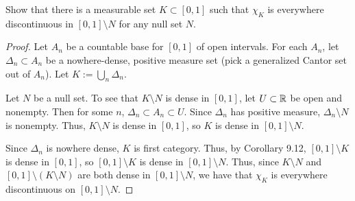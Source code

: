 \documentclass{article}
\begin{document}
 Show that there is a measurable set $K \subset [0,1]$ such that $\chi_K$ is everywhere discontinuous in $[0,1] \setminus N$ for any null set $N$.
\begin{proof}
Let $A_n$ be a countable base for $[0,1]$ of open intervals. For each $A_n$, let $\Delta_n \subset A_n$ be a nowhere-dense, positive measure set (pick a generalized Cantor set out of $A_n$).  Let $K := \bigcup_n \Delta_n$. 

Let $N$ be a null set. To see that $K \setminus N$ is dense in $[0,1]$, let $U \subset \mathbb{R}$ be open and nonempty. Then for some $n$, $\Delta_n \subset A_n \subset U$.  Since $\Delta_n$ has positive measure, $\Delta_n \setminus N$ is nonempty.  Thus, $K \setminus N$ is dense in $[0,1]$, so $K$ is dense in $[0,1] \setminus N$.

Since $\Delta_n$ is nowhere dense, $K$ is first category. Thus,  by Corollary 9.12, $[0,1] \setminus K$ is dense in $[0,1]$, so $[0,1]\setminus K$ is dense in $[0,1] \setminus N$.  Thus, since $K\setminus N$ and $[0,1] \setminus (K\setminus N)$ are both dense in $[0,1] \setminus N$, we have that $\chi_{K}$ is everywhere discontinuous on $[0,1]\setminus N$. 
\end{proof}
\end{document}
